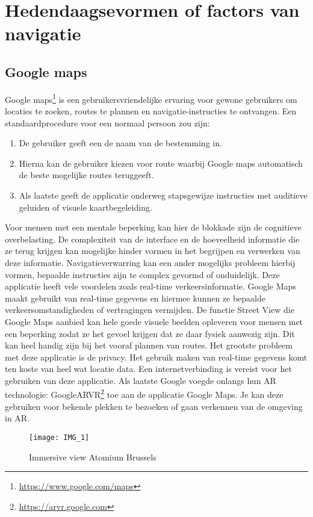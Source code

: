 \section{Hedendaagsevormen of factors van navigatie}
\label{sec:literatuuroverzicht}
\subsection{Google maps}
\label{sec:google maps}
Google maps\footnote{\url{https://www.google.com/maps}} is een gebruikersvriendelijke ervaring voor gewone gebruikers om locaties te zoeken, routes te plannen en navigatie-instructies te ontvangen. Een standaardprocedure voor een normaal persoon zou zijn:
\begin{enumerate}
    \item De gebruiker geeft een de naam van de bestemming in.
    \item Hierna kan de gebruiker kiezen voor route waarbij Google maps automatisch de beste mogelijke routes teruggeeft.
    \item Als laatste geeft de applicatie onderweg stapsgewijze instructies met auditieve geluiden of visuele kaartbegeleiding.
\end{enumerate}
Voor mensen met een mentale beperking kan hier de blokkade zijn de cognitieve overbelasting. De complexiteit van de interface en de hoeveelheid informatie die ze terug krijgen kan mogelijke hinder vormen in het begrijpen en verwerken van deze informatie. Navigatieverwarring kan een ander mogelijks probleem hierbij vormen, bepaalde instructies zijn te complex gevormd of onduidelijk. Deze applicatie heeft vele voordelen zoals real-time verkeersinformatie. Google Maps maakt gebruikt van real-time gegevens en hiermee kunnen ze bepaalde verkeersomstandigheden of vertragingen vermijden. De functie Street View die Google Maps aanbied kan hele goede visuele beelden opleveren voor mensen met een beperking zodat ze het gevoel krijgen dat ze daar fysiek aanwezig zijn. Dit kan heel handig zijn bij het vooraf plannen van routes. Het grootste probleem met deze applicatie is de privacy. Het gebruik maken van real-time gegevens komt ten koste van heel wat locatie data. Een internetverbinding is vereist voor het gebruiken van deze applicatie. Als laatste Google voegde onlangs hun AR technologie: GoogleARVR\footnote{\url{https://arvr.google.com}} toe aan de applicatie Google Maps. Je kan deze gebruiken voor bekende plekken te bezoeken of gaan verkennen van de omgeving in AR.
\begin{figure}
\centering
\captionsetup{justification=centering}
\texttt{[image: IMG\_1]}
\caption[Immersive view Atomium Brussels]{Immersive view Atomium Brussels}
\end{figure}
